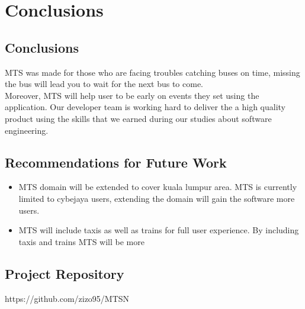 \chapter{Conclusions} 

\label{Chapter7} 


\doublespacing


\section{Conclusions}
MTS was made for those who are facing troubles catching buses on time, missing the bus will lead you to wait for the next bus to come.\\

Moreover, MTS will help user to be early on events they set using the application. Our developer team is working hard to deliver the a high quality product using the skills that we earned during our studies about software engineering.


\section{Recommendations for Future Work}
\begin{itemize}
	\item MTS domain will be extended to cover kuala lumpur area. MTS is currently limited to cybejaya users, extending the domain will gain the software more users.
	\item MTS will include taxis as well as trains for full user experience.
	By including taxis and trains MTS will be more
\end{itemize}

\section{Project Repository}
https://github.com/zizo95/MTSN
